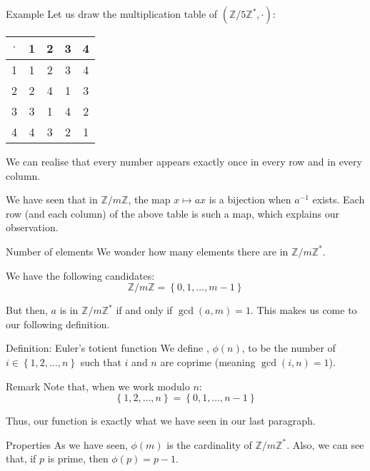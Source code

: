 \documentclass[a4paper]{article}
\begin{document}
\begin{parag}{Example}
    Let us draw the multiplication table of $\left(\mathbb{Z} / 5\mathbb{Z}^*, \cdot\right)$:
    \begin{center}
    \begin{tabular}{c|cccc}
        $\cdot$ & 1 & 2 & 3 & 4 \\
        \hline
        1 & 1 & 2 & 3 & 4 \\
        2 & 2 & 4 & 1 & 3 \\
        3 & 3 & 1 & 4 & 2 \\
        4 & 4 & 3 & 2 & 1 \\
    \end{tabular}
    \end{center}

    We can realise that every number appears exactly once in every row and in every column.

    We have seen that in $\mathbb{Z} / m\mathbb{Z}$, the map $x \mapsto ax$ is a bijection when $a^{-1}$ exists. Each row (and each column) of the above table is such a map, which explains our observation.
\end{parag}

\begin{parag}{Number of elements}
    We wonder how many elements there are in $\mathbb{Z} / m\mathbb{Z}^*$. 

    We have the following candidates: 
    \[\mathbb{Z} / m\mathbb{Z} = \left\{0, 1, \ldots, m -1\right\}\]
    
    But then, $a$ is in $\mathbb{Z} / m\mathbb{Z}^*$ if and only if $\gcd\left(a, m\right) = 1$. This makes us come to our following definition.
\end{parag}

\begin{parag}{Definition: Euler's totient function}
    We define , $\phi\left(n\right)$, to be the number of $i \in\left\{1, 2, \ldots, n\right\}$ such that $i$ and $n$ are coprime (meaning $\gcd\left(i, n\right) = 1$).

    \begin{subparag}{Remark}
        Note that, when we work modulo $n$: 
        \[\left\{1, 2, \ldots, n\right\} = \left\{0, 1, \ldots, n-1\right\}\]

        Thus, our function is exactly what we have seen in our last paragraph.
    \end{subparag}

    \begin{subparag}{Properties}
        As we have seen, $\phi\left(m\right)$ is the cardinality of $\mathbb{Z} / m\mathbb{Z}^*$. Also, we can see that, if $p$ is prime, then $\phi\left(p\right) = p-1$.
    \end{subparag}
\end{parag}
\end{document}
